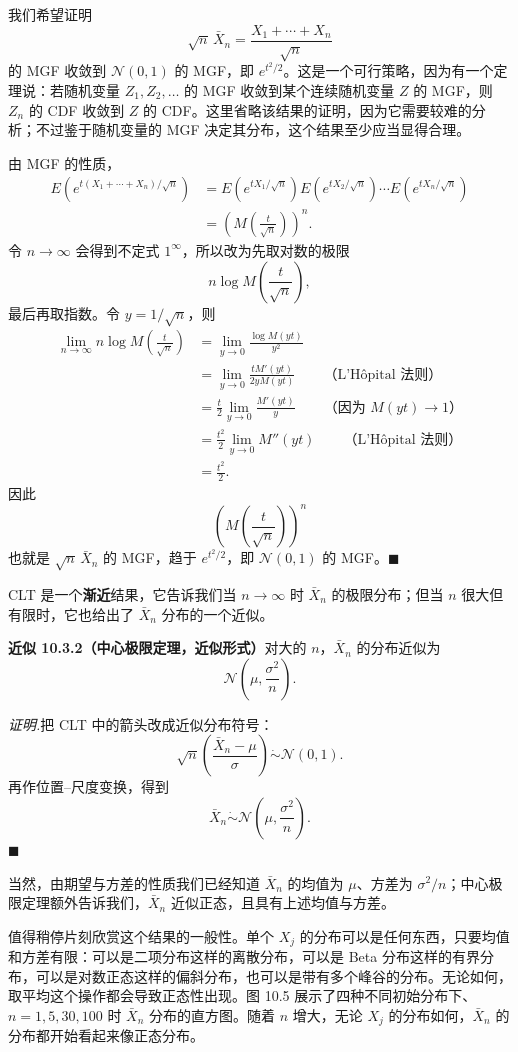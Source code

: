 \documentclass[UTF8,12pt,a4paper,fontset=fandol]{ctexart}
\begin{document}
我们希望证明
\[
  \sqrt n\,\bar X_n=\frac{X_1+\cdots+X_n}{\sqrt n}
\]
的 MGF 收敛到 $\mathcal N(0,1)$ 的 MGF，即 $e^{t^2/2}$。这是一个可行策略，因为有一个定理说：若随机变量 $Z_1,Z_2,\ldots$ 的 MGF 收敛到某个连续随机变量 $Z$ 的 MGF，则 $Z_n$ 的 CDF 收敛到 $Z$ 的 CDF。这里省略该结果的证明，因为它需要较难的分析；不过鉴于随机变量的 MGF 决定其分布，这个结果至少应当显得合理。

由 MGF 的性质，
\[
\begin{aligned}
  E\left(e^{t(X_1+\cdots+X_n)/\sqrt n}\right)
  &=E(e^{tX_1/\sqrt n})E(e^{tX_2/\sqrt n})\cdots E(e^{tX_n/\sqrt n})\\
  &=\left(M\left(\frac{t}{\sqrt n}\right)\right)^n.
\end{aligned}
\]
令 $n\to\infty$ 会得到不定式 $1^\infty$，所以改为先取对数的极限
\[
  n\log M\left(\frac{t}{\sqrt n}\right),
\]
最后再取指数。令 $y=1/\sqrt n$，则
\[
\begin{aligned}
  \lim_{n\to\infty}n\log M\left(\frac{t}{\sqrt n}\right)
  &=\lim_{y\to 0}\frac{\log M(yt)}{y^2}\\
  &=\lim_{y\to 0}\frac{tM'(yt)}{2yM(yt)} \qquad \text{（L'Hôpital 法则）}\\
  &=\frac{t}{2}\lim_{y\to 0}\frac{M'(yt)}{y}\qquad \text{（因为 $M(yt)\to 1$）}\\
  &=\frac{t^2}{2}\lim_{y\to 0}M''(yt)\qquad \text{（L'Hôpital 法则）}\\
  &=\frac{t^2}{2}.
\end{aligned}
\]
因此
\[
  \left(M\left(\frac{t}{\sqrt n}\right)\right)^n
\]
也就是 $\sqrt n\,\bar X_n$ 的 MGF，趋于 $e^{t^2/2}$，即 $\mathcal N(0,1)$ 的 MGF。$\blacksquare$

CLT 是一个\textbf{渐近}结果，它告诉我们当 $n\to\infty$ 时 $\bar X_n$ 的极限分布；但当 $n$ 很大但有限时，它也给出了 $\bar X_n$ 分布的一个近似。

\noindent\textbf{近似 10.3.2（中心极限定理，近似形式）}\quad 对大的 $n$，$\bar X_n$ 的分布近似为
\[
  \mathcal N\left(\mu,\frac{\sigma^2}{n}\right).
\]

\noindent\textit{证明.}\quad 把 CLT 中的箭头改成近似分布符号：
\[
  \sqrt n\left(\frac{\bar X_n-\mu}{\sigma}\right)\dot\sim \mathcal N(0,1).
\]
再作位置--尺度变换，得到
\[
  \bar X_n\dot\sim\mathcal N\left(\mu,\frac{\sigma^2}{n}\right).
\]
$\blacksquare$

当然，由期望与方差的性质我们已经知道 $\bar X_n$ 的均值为 $\mu$、方差为 $\sigma^2/n$；中心极限定理额外告诉我们，$\bar X_n$ 近似正态，且具有上述均值与方差。

值得稍停片刻欣赏这个结果的一般性。单个 $X_j$ 的分布可以是任何东西，只要均值和方差有限：可以是二项分布这样的离散分布，可以是 Beta 分布这样的有界分布，可以是对数正态这样的偏斜分布，也可以是带有多个峰谷的分布。无论如何，取平均这个操作都会导致正态性出现。图 10.5 展示了四种不同初始分布下、$n=1,5,30,100$ 时 $\bar X_n$ 分布的直方图。随着 $n$ 增大，无论 $X_j$ 的分布如何，$\bar X_n$ 的分布都开始看起来像正态分布。
\end{document}
